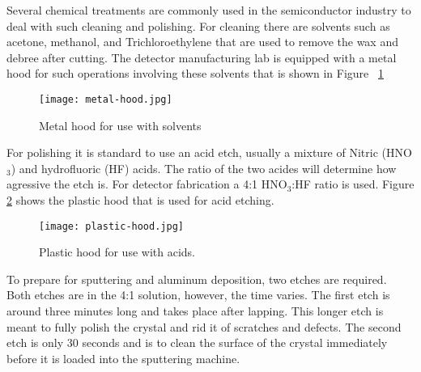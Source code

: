 Several chemical treatments are commonly used in the semiconductor industry to deal with such cleaning and polishing.
For cleaning there are solvents such as acetone, methanol, and Trichloroethylene that are used to remove the wax and debree after cutting.
The detector manufacturing lab is equipped with a metal hood for such operations involving these solvents that is shown in Figure ~\ref{fig:metalhood}
\begin{figure}[htpb]
\centering
\texttt{[image: metal-hood.jpg]}
\caption{Metal hood for use with solvents}
\label{fig:metalhood}
\end{figure}

For polishing it is standard to use an acid etch, usually a mixture of Nitric (HNO$_3$) and hydrofluoric (HF) acids.
The ratio of the two acides will determine how agressive the etch is.
For detector fabrication a 4:1 HNO$_3$:HF ratio is used.
Figure \ref{fig:plastichood} shows the plastic hood that is used for acid etching.
\begin{figure}[htpb]
\centering
\texttt{[image: plastic-hood.jpg]}
\caption{Plastic hood for use with acids.}
\label{fig:plastichood}
\end{figure}
To prepare for sputtering and aluminum deposition, two etches are required.
Both etches are in the 4:1 solution, however, the time varies.
The first etch is around three minutes long and takes place after lapping.
This longer etch is meant to fully polish the crystal and rid it of scratches and defects.
The second etch is only 30 seconds and is to clean the surface of the crystal immediately before it is loaded into the sputtering machine.


